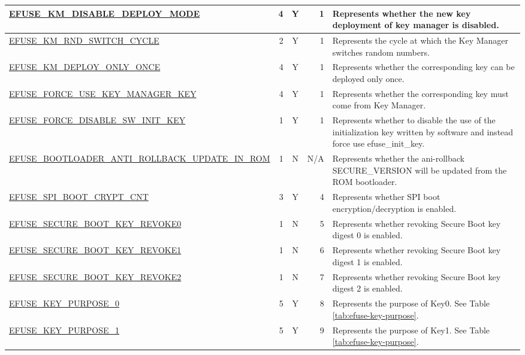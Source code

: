 \begin{longtable}[l]{ |m{8.2cm}|r|c|r|m{9cm}| }
    \hyperref[fielddesc:EFUSEKMDISABLEDEPLOYMODE]{EFUSE\_KM\_DISABLE\_DEPLOY\_MODE} & 4 & Y & 1 & Represents whether the new key deployment of key manager is disabled.  \\ \hline
    \hyperref[fielddesc:EFUSEKMRNDSWITCHCYCLE]{EFUSE\_KM\_RND\_SWITCH\_CYCLE} & 2 & Y & 1 & Represents the cycle at which the Key Manager switches random numbers. \\ \hline
    \hyperref[fielddesc:EFUSEKMDEPLOYONLYONCE]{EFUSE\_KM\_DEPLOY\_ONLY\_ONCE} & 4 & Y & 1 & Represents whether the corresponding key can be deployed only once. \\ \hline
    \hyperref[fielddesc:EFUSEFORCEUSEKEYMANAGERKEY]{EFUSE\_FORCE\_USE\_KEY\_MANAGER\_KEY} & 4 & Y & 1 & Represents whether the corresponding key must come from Key Manager.  \\ \hline
    \hyperref[fielddesc:EFUSEFORCEDISABLESWINITKEY]{EFUSE\_FORCE\_DISABLE\_SW\_INIT\_KEY} & 1 & Y & 1 & Represents whether to disable the use of the initialization key written by software and instead force use efuse\_init\_key. \\ \hline
    \hyperref[fielddesc:EFUSEBOOTLOADERANTIROLLBACKUPDATEINROM]{EFUSE\_\-BOOTLOADER\_\-ANTI\_\-ROLLBACK\_\-UPDATE\_\-IN\_\-ROM} & 1 & N & N/A & Represents whether the ani-rollback SECURE\_VERSION will be updated from the ROM bootloader. \\ \hline
    \hyperref[fielddesc:EFUSESPIBOOTCRYPTCNT]{EFUSE\_SPI\_BOOT\_CRYPT\_CNT} & 3 & Y & 4 & Represents whether SPI boot encryption/decryption is enabled.  \\ \hline
    \hyperref[fielddesc:EFUSESECUREBOOTKEYREVOKE0]{EFUSE\_SECURE\_BOOT\_KEY\_REVOKE0} & 1 & N & 5 & Represents whether revoking Secure Boot key digest 0 is enabled.  \\ \hline
    \hyperref[fielddesc:EFUSESECUREBOOTKEYREVOKE1]{EFUSE\_SECURE\_BOOT\_KEY\_REVOKE1} & 1 & N & 6 & Represents whether revoking Secure Boot key digest 1 is enabled. \\ \hline
    \hyperref[fielddesc:EFUSESECUREBOOTKEYREVOKE2]{EFUSE\_SECURE\_BOOT\_KEY\_REVOKE2} & 1 & N & 7 & Represents whether revoking Secure Boot key digest 2 is enabled. \\ \hline
    \hyperref[fielddesc:EFUSEKEYPURPOSE0]{EFUSE\_KEY\_PURPOSE\_0} & 5 & Y & 8 & Represents the purpose of Key0. See Table \ref{tab:efuse-key-purpose}. \\ \hline
    \hyperref[fielddesc:EFUSEKEYPURPOSE1]{EFUSE\_KEY\_PURPOSE\_1} & 5 & Y & 9 & Represents the purpose of Key1. See Table \ref{tab:efuse-key-purpose}. \\ \hline

\end{longtable}
